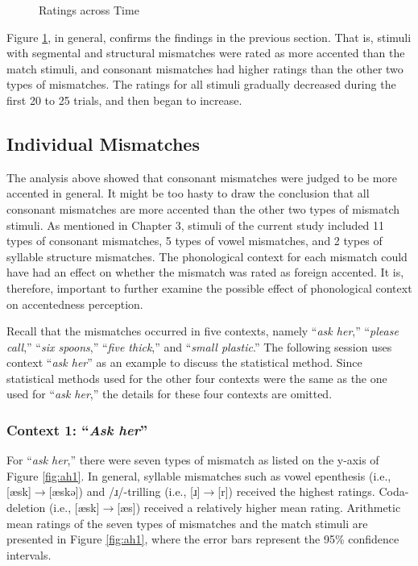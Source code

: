 \begin{figure}[h!]
  \figSpace
    \centering

    \caption{Ratings across Time}
    \label{fig:trial1}
  \figSpace
\end{figure}

Figure \ref{fig:trial1}, in general, confirms the findings in the previous section. That is, stimuli with segmental and structural mismatches were rated as more accented than the match stimuli, and consonant mismatches had higher ratings than the other two types of mismatches. The ratings for all stimuli gradually decreased during the first 20 to 25 trials, and then began to increase. 

\subsection{Individual Mismatches}
The analysis above showed that consonant mismatches were judged to be more accented in general. It might be too hasty to draw the conclusion that all consonant mismatches are more accented than the other two types of mismatch stimuli. As mentioned in Chapter 3, stimuli of the current study included 11 types of consonant mismatches, 5 types of vowel mismatches, and 2 types of syllable structure mismatches. The phonological context for each mismatch could have had an effect on whether the mismatch was rated as foreign accented. It is, therefore, important to further examine the possible effect of phonological context on accentedness perception.

Recall that the mismatches occurred in five contexts, namely “\textit{ask her},” “\textit{please call},” “\textit{six spoons},” “\textit{five thick},” and “\textit{small plastic}.” The following session uses context “\textit{ask her}” as an example to discuss the statistical method. Since statistical methods used for the other four contexts were the same as the one used for “\textit{ask her},” the details for these four contexts are omitted.


\subsubsection{Context 1: “\textit{Ask her}”}

For “\textit{ask her},” there were seven types of mismatch as listed on the y-axis of Figure \ref{fig:ah1}. In general, syllable mismatches such as vowel epenthesis (i.e., [æsk]$\rightarrow$[æskə]) and /ɹ/-trilling (i.e., [ɹ]$\rightarrow$[r]) received the highest ratings. Coda-deletion (i.e., [æsk]$\rightarrow$[æs]) received a relatively higher mean rating. Arithmetic mean ratings of the seven types of mismatches and the match stimuli are presented in Figure \ref{fig:ah1}, where the error bars represent the 95\% confidence intervals.

